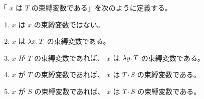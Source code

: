 \documentclass[book]{jlreq}
\begin{document}
「 \( x \) は \( T \) の束縛変数である」を次のように定義する。

\begin{enumerate}
    \item \( x \) は \( x \) の束縛変数ではない。
    \item \( x \) は \( \lambda x \ldotp T \) の束縛変数である。
    \item \( x \) が \( T \) の束縛変数であれば、 \( x \) は \( \lambda y \ldotp T \) の束縛変数である。
    \item \( x \) が \( T \) の束縛変数であれば、 \( x \) は \( T \cdot S \) の束縛変数である。
    \item \( x \) が \( S \) の束縛変数であれば、 \( x \) は \( T \cdot S \) の束縛変数である。
\end{enumerate}
\end{document}
